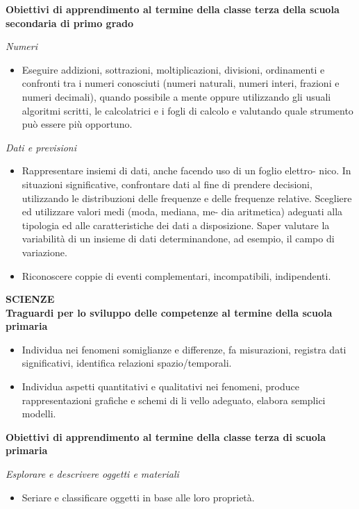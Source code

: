 \documentclass[12pt]{report}
\begin{document}
\medskip
\noindent \textbf{Obiettivi di apprendimento al termine della classe terza della scuola secondaria di primo grado}
\begin{description}
	\item \textit{Numeri}
	\begin{itemize}
		\item Eseguire addizioni, sottrazioni, moltiplicazioni, divisioni, ordinamenti e confronti tra i numeri conosciuti (numeri naturali, numeri interi, frazioni e numeri decimali), quando possibile a mente oppure utilizzando gli usuali algoritmi scritti, le calcolatrici e i fogli di calcolo e valutando quale strumento può essere più opportuno.
	\end{itemize}
	\medskip
	\item \textit{Dati e previsioni}
	\begin{itemize}
		\item Rappresentare insiemi di dati, anche facendo uso di un foglio elettro- nico. In situazioni significative, confrontare dati al fine di prendere decisioni, utilizzando le distribuzioni delle frequenze e delle frequenze relative. Scegliere ed utilizzare valori medi (moda, mediana, me- dia aritmetica) adeguati alla tipologia ed alle caratteristiche dei dati a disposizione. Saper valutare la variabilità di un insieme di dati determinandone, ad esempio, il campo di variazione.
		\item Riconoscere coppie di eventi complementari, incompatibili, indipendenti.
	\end{itemize}
\end{description}

\bigskip
\noindent \textbf{SCIENZE}
\\
\textbf{Traguardi per lo sviluppo delle competenze al termine della scuola primaria}
\begin{itemize}
	\item Individua nei fenomeni somiglianze e differenze, fa misurazioni, registra dati significativi, identifica relazioni spazio/temporali.
	\item Individua aspetti quantitativi e qualitativi nei fenomeni, produce rappresentazioni grafiche e schemi di li vello adeguato, elabora semplici modelli.
\end{itemize}

\medskip
\noindent \textbf{Obiettivi di apprendimento al termine della classe terza di scuola primaria}
\begin{description}
	\item \textit{Esplorare e descrivere oggetti e materiali}
	\begin{itemize}
		\item Seriare e classificare oggetti in base alle loro proprietà.
	\end{itemize}
\end{description}
\end{document}
